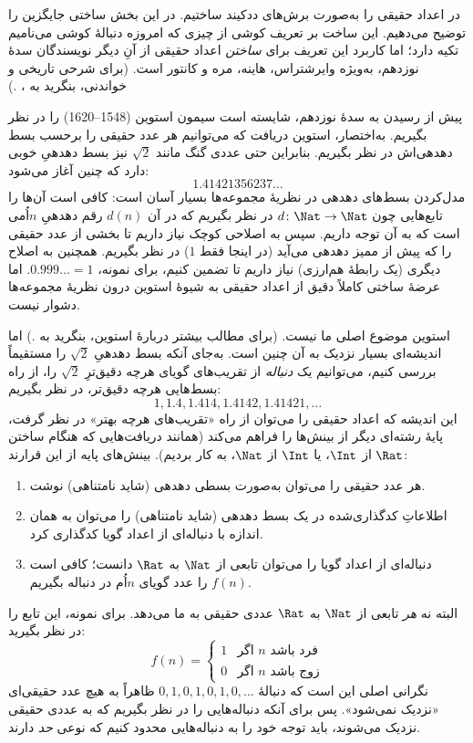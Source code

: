 \documentclass[../../../include/open-logic-section]{subfiles}
\begin{document}


در  اعداد حقیقی را به‌صورت برش‌های ددکیند ساختیم. در این
بخش ساختی جایگزین را توضیح می‌دهیم. این ساخت بر تعریف کوشی از چیزی که
امروزه دنبالهٔ کوشی می‌نامیم تکیه دارد؛ اما کاربرد این تعریف برای
\emph{ساختن} اعداد حقیقی از آنِ دیگر نویسندگان سدهٔ نوزدهم، به‌ویژه
وایرشتراس، هاینه، مره و کانتور است. (برای شرحی تاریخی و خواندنی، بنگرید
به \citeauthor{OConnorRobertson:RN}، \citeyear{OConnorRobertson:RN}.)

پیش از رسیدن به سدهٔ نوزدهم، شایسته است سیمون استوین (1548--1620) را در
نظر بگیریم. به‌اختصار، استوین دریافت که می‌توانیم هر عدد حقیقی را برحسب
بسط دهدهی‌اش در نظر بگیریم. بنابراین حتی عددی گنگ مانند $\sqrt{2}$ نیز
بسط دهدهیِ خوبی دارد که چنین آغاز می‌شود:
\[
	1.41421356237\ldots
\] 
مدل‌کردن بسط‌های دهدهی در نظریهٔ مجموعه‌ها بسیار آسان است: کافی است آن‌ها
را تابع‌هایی چون $d \colon \Nat \to \Nat$ در نظر بگیریم که در آن $d(n)$
رقم دهدهیِ $n$اُمی است که به آن توجه داریم. سپس به اصلاحی کوچک نیاز داریم
تا بخشی از عدد حقیقی را که پیش از ممیز دهدهی می‌آید (در اینجا فقط $1$)
در نظر بگیریم. همچنین به اصلاح دیگری (یک رابطهٔ هم‌ارزی) نیاز داریم تا
تضمین کنیم، برای نمونه، $0.999\ldots = 1$. اما عرضهٔ ساختی کاملاً دقیق از
اعداد حقیقی به شیوهٔ استوین درون نظریهٔ مجموعه‌ها دشوار نیست.

استوین موضوع اصلی ما نیست. (برای مطالب بیشتر دربارهٔ استوین، بنگرید به
\citealt{KatzKatz2012}.) اما اندیشه‌ای بسیار نزدیک به آن چنین است. به‌جای
آنکه بسط دهدهیِ $\sqrt{2}$ را مستقیماً بررسی کنیم، می‌توانیم یک
\emph{دنباله} از تقریب‌های گویای هرچه دقیق‌ترِ $\sqrt{2}$ را، از راه
بسط‌هایی هرچه دقیق‌تر، در نظر بگیریم:
\[
1, 1.4, 1.414, 1.4142, 1.41421,\ldots
\]
این اندیشه که اعداد حقیقی را می‌توان از راه «تقریب‌های هرچه بهتر» در نظر
گرفت، پایهٔ رشته‌ای دیگر از بینش‌ها را فراهم می‌کند (همانند دریافت‌هایی
که هنگام ساختن $\Rat$ از $\Int$، یا $\Int$ از $\Nat$، به کار بردیم).
بینش‌های پایه از این قرارند:
\begin{enumerate}
	\item هر عدد حقیقی را می‌توان به‌صورت بسطی دهدهی (شاید نامتناهی) نوشت.
	\item اطلاعاتِ کدگذاری‌شده در یک بسط دهدهی (شاید نامتناهی) را می‌توان
	به همان اندازه با دنباله‌ای از اعداد گویا کدگذاری کرد.
	\item دنباله‌ای از اعداد گویا را می‌توان تابعی از $\Nat$ به $\Rat$ دانست؛
	کافی است $f(n)$ را عدد گویای $n$اُم در دنباله بگیریم.
\end{enumerate}
البته نه \emph{هر} تابعی از $\Nat$ به $\Rat$ عددی حقیقی به ما می‌دهد.
برای نمونه، این تابع را در نظر بگیرید:
\[
	f(n) =\begin{cases}
			1 & \text{اگر }n\text{ فرد باشد}\\
			0 &\text{اگر }n\text{ زوج باشد}
		\end{cases}
\]
نگرانی اصلی این است که دنبالهٔ $0,1,0,1,0,1,0,\ldots$ ظاهراً به هیچ
عدد حقیقی‌ای «نزدیک نمی‌شود». پس برای آنکه دنباله‌هایی را در نظر بگیریم
که به عددی حقیقی نزدیک می‌شوند، باید توجه خود را به دنباله‌هایی محدود کنیم
که نوعی \emph{حد} دارند.
\end{document}
